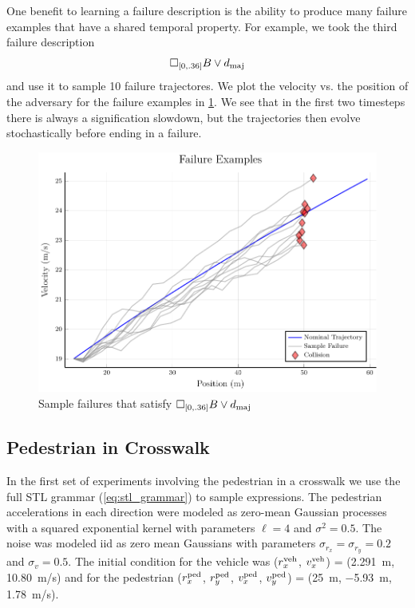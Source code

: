 One benefit to learning a failure description is the ability to produce many failure examples that have a shared temporal property. For example, we took the third failure description
\begin{equation}
    \square_{[0, .36]} B \lor d_{\rm maj}
\end{equation}
and use it to sample \num{10} failure trajectores. We plot the velocity vs. the position of the adversary for the failure examples in \cref{fig:2car_failure_samples}. We see that in the first two timesteps there is always a signification slowdown, but the trajectories then evolve stochastically before ending in a failure. 

\begin{figure}
    \centering
    \includegraphics[scale=0.6]{figures/interpretable_validation/2car_sample_failures.pdf}
    \caption{Sample failures that satisfy $\square_{[0, .36]} B \lor d_{\rm maj}$}
    \label{fig:2car_failure_samples}
\end{figure}


\subsection{Pedestrian in Crosswalk}

In the first set of experiments involving the pedestrian in a crosswalk we use the full STL grammar (\cref{eq:stl_grammar}) to sample expressions. The pedestrian accelerations in each direction were modeled as zero-mean Gaussian processes with a squared exponential kernel with parameters $\ell = 4$ and $\sigma^2 = 0.5$. The noise was modeled iid as zero mean Gaussians with parameters $\sigma_{r_x} = \sigma_{r_y} = 0.2$ and $\sigma_{v} = 0.5$. The initial condition for the vehicle was ($r_x^{\rm veh}$, $v_x^{\rm veh}$) = (\SI{2.291}{m}, \SI{10.80}{m/s}) and for the pedestrian ($r^{\rm ped}_x$, $r^{\rm ped}_y$, $v^{\rm ped}_x$, $v^{\rm ped}_y$) = (\SI{25}{m}, \SI{-5.93}{m}, \SI{1.78}{m/s}).


